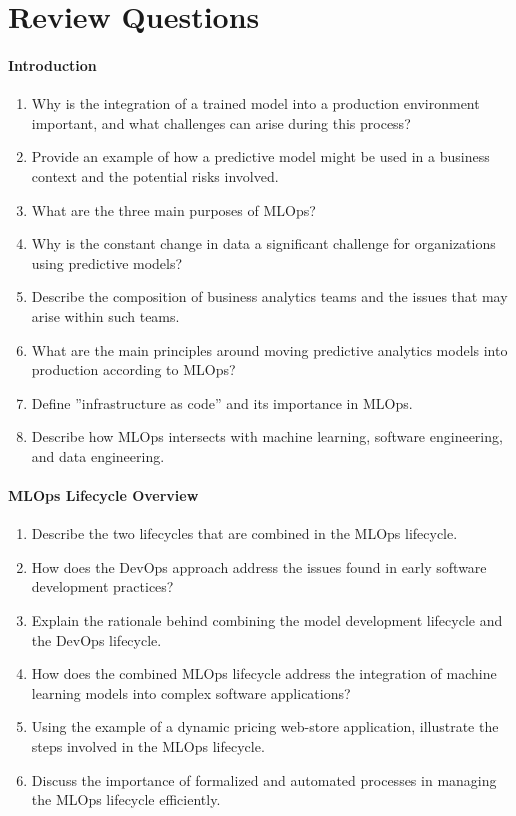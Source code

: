\section{Review Questions}
\paragraph*{Introduction}
\begin{enumerate}[nosep]
    \item Why is the integration of a trained model into a production environment important, and what challenges can arise during this process?
    \item Provide an example of how a predictive model might be used in a business context and the potential risks involved.
    \item What are the three main purposes of MLOps?
    \item Why is the constant change in data a significant challenge for organizations using predictive models?
    \item Describe the composition of business analytics teams and the issues that may arise within such teams.
    \item What are the main principles around moving predictive analytics models into production according to MLOps?
    \item Define ''infrastructure as code'' and its importance in MLOps.
    \item Describe how MLOps intersects with machine learning, software engineering, and data engineering.
\end{enumerate}
\paragraph*{MLOps Lifecycle Overview}
\begin{enumerate}
    \item Describe the two lifecycles that are combined in the MLOps lifecycle.
    \item How does the DevOps approach address the issues found in early software development practices?
    \item Explain the rationale behind combining the model development lifecycle and the DevOps lifecycle.
    \item How does the combined MLOps lifecycle address the integration of machine learning models into complex software applications?
    \item Using the example of a dynamic pricing web-store application, illustrate the steps involved in the MLOps lifecycle.
    \item Discuss the importance of formalized and automated processes in managing the MLOps lifecycle efficiently.
\end{enumerate}
